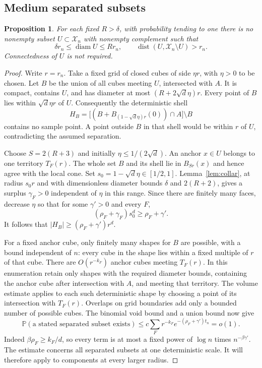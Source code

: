 \documentclass[11pt]{article}
\newtheorem{proposition}[theorem]{Proposition}
\theoremstyle{remark}
\newcommand{\Pp}{\mathbb P}
\newcommand{\dist}{\operatorname{dist}}
\newcommand{\diam}{\operatorname{diam}}
\begin{document}
\subsection{Medium separated subsets}
\begin{proposition}\label{prop:medium}
For each fixed $R>\delta$, with probability tending to one there is no
nonempty subset $U\subset\mathcal X_n$ with nonempty complement such that
\[
 \delta r_n\leq\diam U\leq Rr_n,
 \qquad \dist(U,\mathcal X_n\setminus U)>r_n.
\]
Connectedness of $U$ is not required.
\end{proposition}
\begin{proof}
Write $r=r_n$. Take a fixed grid of closed cubes of side $\eta r$, with
$\eta>0$ to be chosen. Let $B$ be the union of all cubes meeting $U$,
intersected with $A$. It is compact, contains $U$, and has diameter at most
$(R+2\sqrt d\eta)r$. Every point of $B$ lies within $\sqrt d\eta r$ of $U$.
Consequently the deterministic shell
\[
 H_B=\big[(B+B_{(1-\sqrt d\eta)r}(0))\cap A\big]\setminus B
\]
contains no sample point. A point outside $B$ in that shell would be within
$r$ of $U$, contradicting the assumed separation.

Choose $S=2(R+3)$ and initially $\eta\leq1/(2\sqrt d)$.
An anchor $x\in U$ belongs to one territory $T_F(r)$. The whole set $B$ and
its shell lie in $B_{Sr}(x)$ and hence agree with the local cone.
Set $s_0=1-\sqrt d\eta\in[1/2,1]$. Lemma~\ref{lem:collar}, at radius
$s_0r$ and with dimensionless diameter bounds $\delta$ and $2(R+2)$,
gives a surplus $\gamma_F>0$ independent of $\eta$ in this range.
Since there are finitely many faces, decrease $\eta$ so that for some
$\gamma'>0$ and every $F$,
\[
 (\rho_F+\gamma_F)s_0^d\geq\rho_F+\gamma'.
\]
It follows that $|H_B|\geq(\rho_F+\gamma')r^d$.

For a fixed anchor cube, only finitely many shapes for $B$ are possible,
with a bound independent of $n$: every cube in the shape lies within a
fixed multiple of $r$ of that cube. There are $O(r^{-k_F})$ anchor cubes
meeting $T_F(r)$. In this enumeration retain only shapes with the required
diameter bounds, containing the anchor cube after intersection with $A$,
and meeting that territory. The volume estimate applies to each such
deterministic shape by choosing a point of its intersection with $T_F(r)$.
Overlaps on grid boundaries add only a bounded number of possible cubes.
The binomial void bound and a union bound now give
\begin{equation}\label{eq:mediumvoid}
 \Pp(\text{a stated separated subset exists})
 \leq c\sum_F r^{-k_F}e^{-(\rho_F+\gamma')t_n}=o(1).
\end{equation}
Indeed $\beta\rho_F\geq k_F/d$, so every term is at most a fixed power of
$\log n$ times $n^{-\beta\gamma'}$. The estimate concerns all separated
subsets at one deterministic scale. It will therefore apply to components
at every larger radius.
\end{proof}
\end{document}
